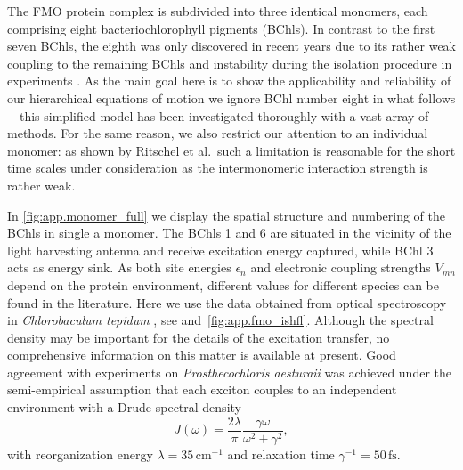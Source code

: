 
The FMO protein complex is subdivided into three identical monomers, each comprising eight bacteriochlorophyll pigments (BChls).
In contrast to the first seven BChls, the eighth was only discovered in recent years due to its rather weak coupling to the remaining BChls and instability during the isolation procedure in experiments \cite{TrCaBl09_fmo_structure,ScMuEl10_eighth}.
As the main goal here is to show the applicability and reliability of our hierarchical equations of motion we ignore BChl number eight in what follows---this simplified model has been investigated thoroughly with a vast array of methods.
For the same reason, we also restrict our attention to an individual monomer: as shown by Ritschel et al.\ such a limitation is reasonable for the short time scales under consideration as the intermonomeric interaction strength is rather weak.

In \autoref{fig:app.monomer_full} we display the spatial structure and numbering of the BChls in single a monomer.
The BChls 1 and 6 are situated in the vicinity of the light harvesting antenna and receive excitation energy captured, while BChl 3 acts as energy sink.
As both site energies $\epsilon_n$ and electronic coupling strengths $V_{mn}$ depend on the protein environment, different values for different species can be found in the literature.
Here we use the data obtained from optical spectroscopy in \emph{Chlorobaculum tepidum} \cite{AdRe06_fmo}, see  and~\ref{fig:app.fmo_ishfl}.
Although the spectral density may be important for the details of the excitation transfer, no comprehensive information on this matter is available at present.
Good agreement with experiments on \emph{Prosthecochloris aesturaii} was achieved \cite{ReScEn08_fmo_spectral_density} under the semi-empirical assumption that each exciton couples to an independent environment with a Drude spectral density
\begin{equation}
  J(\omega) = \frac{2 \lambda}{\pi} \frac{\gamma\omega}{\omega^2 + \gamma^2},
  \label{eq:app.drude}
\end{equation}
with reorganization energy $\lambda = 35\,\mathrm{cm^{-1}}$ and relaxation time $\gamma^{-1} = 50\,\mathrm{fs}$.\\



